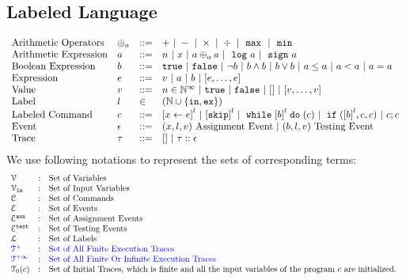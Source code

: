 \subsection{Labeled Language}
\[
\begin{array}{llll}
\mbox{Arithmetic Operators} 
& \oplus_a & ::= & + ~|~ - ~|~ \times 
%
~|~ \div ~|~ \emax ~|~ \emin
\\  
\mbox{Arithmetic Expression} 
& \aexpr & ::= & 
n ~|~ {x} ~|~ \aexpr \oplus_a \aexpr  
 ~|~ \elog \aexpr  ~|~ \esign \aexpr
\\
\mbox{Boolean Expression} & \bexpr & ::= & 
%
\etrue ~|~ \efalse  ~|~ \neg \bexpr
 ~|~ \bexpr \land \bexpr
%
~|~ \bexpr \lor \bexpr
~|~ \aexpr \leq \aexpr 
~|~ \aexpr < \aexpr 
~|~ \aexpr = \aexpr 
\\
\mbox{Expression} & \expr & ::= & v ~|~ \aexpr ~|~ \bexpr ~|~ [\expr, \dots, \expr]
\\  
%
\mbox{Value} 
& v & ::= & { n \in \mathbb{N}^{\infty} ~|~ \etrue ~|~ \efalse ~|~ [] ~|~ [v, \dots, v]} \\
%
\mbox{Label} 
& l & \in & (\mathbb{N} \cup \{\lin, \lex\}) 
\\ 
%
\mbox{Labeled Command} 
& {c} & ::= &  
\clabel{\assign{x}{\expr}}^l 
~|~  \clabel{\eskip}^l
~|~ \ewhile \clabel{\bexpr}^{l} \edo ({c})
~|~ \eif(\clabel{\bexpr}^{l} , {c}, {c}) 
~|~ {c};{c}  
\\ 
\mbox{Event} 
& \event & ::= & 
({x}, l, v) ~ \mbox{Assignment Event} 
~|~(\bexpr, l, v) ~ \mbox{Testing Event}
\\
\mbox{Trace} & \trace
& ::= & [] ~|~ \trace :: \event
\\
\end{array}
\]
We use following notations to represent the sets of corresponding terms:
\[
\begin{array}{lll}
\vardom & : & \mbox{Set of Variables}  
\\ 
%
\inpvar & : & \mbox{Set of Input Variables}  
\\ 
%
\cdom & : & \mbox{Set of Commands} 
\\ 
%
\eventset  & : & \mbox{Set of Events}  
\\
%
\eventset^{\asn}  & : & \mbox{Set of Assignment Events}  
\\
%
\eventset^{\test}  & : & \mbox{Set of Testing Events}  
\\
%
\ldom  & : & \mbox{Set of Labels}  
\\
%
\highlight{\ftdom} & : & \mbox{\highlight{Set of All Finite Execution Traces}}
\\
\highlight{\inftdom} & : & \mbox{\highlight{Set of All Finite Or Infinite  Execution Traces}}
\\
%
\tdom_0(c) & : & \mbox{Set of Initial Traces, which is finite and all the input variables of the program $c$ are initialized.
}
\end{array}
\]
%
